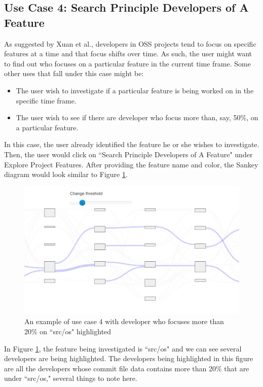 \documentclass{article}
\begin{document}
\subsection{Use Case 4: Search Principle Developers of A Feature}
As suggested by Xuan et al.\citep{xuan2014focus}, developers in OSS projects tend to focus on specific features at a time and that focus shifts over time. As such, the user might want to find out who focuses on a particular feature in the current time frame. Some other uses that fall under this case might be:
\begin{itemize}
    \item The user wish to investigate if a particular feature is being worked on in the specific time frame.
    \item The user wish to see if there are developer who focus more than, say, 50\%, on a particular feature.
\end{itemize}
In this case, the user already identified the feature he or she wishes to investigate. Then, the user would click on ``Search Principle Developers of A Feature" under Explore Project Features. After providing the feature name and color, the Sankey diagram would look similar to Figure \ref{fig:usecase4}.
\begin{figure}[h!]
\centering
\includegraphics[scale=0.6]{images/usecase4.JPG}
\caption{An example of use case 4 with developer who focuses more than 20\% on ``src/os" highlighted}
\label{fig:usecase4}
\end{figure}
In Figure \ref{fig:usecase4}, the feature being investigated is ``src/os" and we can see several developers are being highlighted. The developers being highlighted in this figure are all the developers whose commit file data contains more than 20\% that are under ``src/os," several things to note here.
\end{document}
